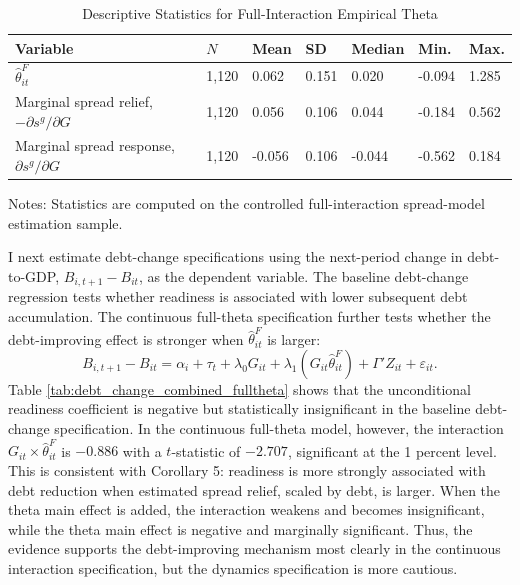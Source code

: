 \documentclass[11pt]{article}
\theoremstyle{definition}
\begin{document}
\begin{table}[H]\centering
\begin{threeparttable}
\caption{Descriptive Statistics for Full-Interaction Empirical Theta}
\label{tab:theta_descriptive_stats}
\scriptsize
\begin{tabularx}{\textwidth}{lYYYYYY}
\toprule
Variable & $N$ & Mean & SD & Median & Min. & Max. \\
\midrule
$\widehat{\theta}^{F}_{it}$ & 1,120 & 0.062 & 0.151 & 0.020 & -0.094 & 1.285 \\
Marginal spread relief, $-\partial s^g/\partial G$ & 1,120 & 0.056 & 0.106 & 0.044 & -0.184 & 0.562 \\
Marginal spread response, $\partial s^g/\partial G$ & 1,120 & -0.056 & 0.106 & -0.044 & -0.562 & 0.184 \\
\bottomrule
\end{tabularx}
\begin{tablenotes}[flushleft]\footnotesize
\item Notes: Statistics are computed on the controlled full-interaction spread-model estimation sample.
\end{tablenotes}
\end{threeparttable}
\end{table}

I next estimate debt-change specifications using the next-period change in debt-to-GDP, $B_{i,t+1}-B_{it}$, as the dependent variable. The baseline debt-change regression tests whether readiness is associated with lower subsequent debt accumulation. The continuous full-theta specification further tests whether the debt-improving effect is stronger when $\widehat{\theta}^F_{it}$ is larger:
\begin{equation}
    B_{i,t+1}-B_{it}=\alpha_i+\tau_t+\lambda_0G_{it}+
    \lambda_1(G_{it}\widehat{\theta}^F_{it})+\Gamma'Z_{it}+\varepsilon_{it}.
\end{equation}
Table \ref{tab:debt_change_combined_fulltheta} shows that the unconditional readiness coefficient is negative but statistically insignificant in the baseline debt-change specification. In the continuous full-theta model, however, the interaction $G_{it}\times\widehat{\theta}^F_{it}$ is $-0.886$ with a $t$-statistic of $-2.707$, significant at the 1 percent level. This is consistent with Corollary 5: readiness is more strongly associated with debt reduction when estimated spread relief, scaled by debt, is larger. When the theta main effect is added, the interaction weakens and becomes insignificant, while the theta main effect is negative and marginally significant. Thus, the evidence supports the debt-improving mechanism most clearly in the continuous interaction specification, but the dynamics specification is more cautious.
\end{document}

